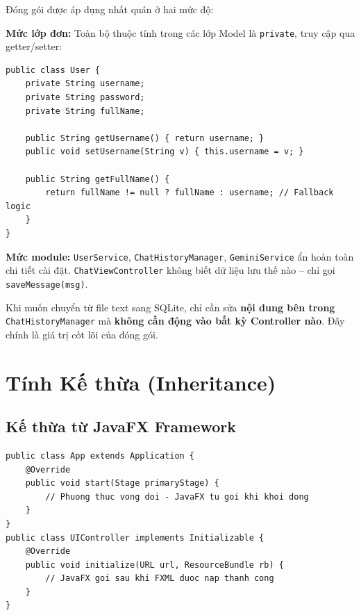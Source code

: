 \documentclass[12pt, a4paper, oneside]{report}
\newcommand{\code}[1]{\texttt{\color{hustblue!80!black}#1}}
\begin{document}
Đóng gói được áp dụng nhất quán ở hai mức độ:

\textbf{Mức lớp đơn:} Toàn bộ thuộc tính trong các lớp Model là
\code{private}, truy cập qua getter/setter:

\begin{lstlisting}[caption={Đóng gói trong lớp User},
                   label=lst:encap, style=javastyle]
public class User {
    private String username;
    private String password;
    private String fullName;

    public String getUsername() { return username; }
    public void setUsername(String v) { this.username = v; }

    public String getFullName() {
        return fullName != null ? fullName : username; // Fallback logic
    }
}
\end{lstlisting}

\textbf{Mức module:} \code{UserService}, \code{ChatHistoryManager},
\code{GeminiService} ẩn hoàn toàn chi tiết cài đặt. \code{ChatViewController}
không biết dữ liệu lưu thế nào -- chỉ gọi \code{saveMessage(msg)}.

\begin{tcolorbox}[infostyle, title={Lợi ích thực tế}]
Khi muốn chuyển từ file text sang SQLite, chỉ cần sửa \textbf{nội dung bên
trong} \code{ChatHistoryManager} mà \textbf{không cần động vào bất kỳ
Controller nào}. Đây chính là giá trị cốt lõi của đóng gói.
\end{tcolorbox}

\section{Tính Kế thừa (Inheritance)}

\subsection{Kế thừa từ JavaFX Framework}

\begin{lstlisting}[caption={App kế thừa Application và override vòng đời},
                   label=lst:inherit, style=javastyle]
public class App extends Application {
    @Override
    public void start(Stage primaryStage) {
        // Phuong thuc vong doi - JavaFX tu goi khi khoi dong
    }
}
public class UIController implements Initializable {
    @Override
    public void initialize(URL url, ResourceBundle rb) {
        // JavaFX goi sau khi FXML duoc nap thanh cong
    }
}
\end{lstlisting}
\end{document}
